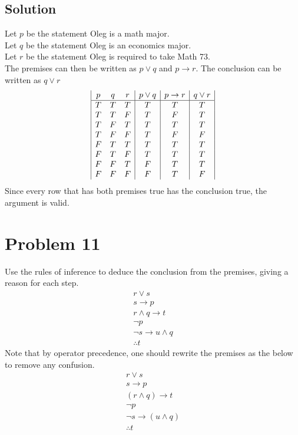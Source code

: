 \documentclass[table]{article}
\begin{document}
\subsection{Solution}
Let $p$ be the statement Oleg is a math major.\\
Let $q$ be the statement Oleg is an economics major.\\
Let $r$ be the statement Oleg is required to take Math 73.\\
The premises can then be written as $p \lor q$ and $p \rightarrow r$. The conclusion can be written as $q \lor r$
\begin{displaymath}
\begin{array}{|c c c|c|c|c|}
p & q & r & p \lor q & p \rightarrow r & q \lor r\\
\hline
T & T & T & T & T & T\\
T & T & F & T & F & T\\
T & F & T & T & T & T\\
T & F & F & T & F & F\\
F & T & T & T & T & T\\
F & T & F & T & T & T\\
F & F & T & F & T & T\\
F & F & F & F & T & F\\
\end{array}
\end{displaymath}
Since every row that has both premises true has the conclusion true, the argument is valid.
\section{Problem 11}
Use the rules of inference to deduce the conclusion from the premises, giving a reason for each step.
\begin{gather*}
r \lor s\\
s \rightarrow p\\
r \land q \rightarrow t\\
\neg p\\
\neg s \rightarrow u \land q\\
\therefore t
\end{gather*}
Note that by operator precedence, one should rewrite the premises as the below to remove any confusion.
\begin{gather*}
r \lor s\\
s \rightarrow p\\
(r \land q) \rightarrow t\\
\neg p\\
\neg s \rightarrow (u \land q)\\
\therefore t
\end{gather*}
\end{document}
